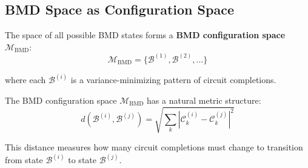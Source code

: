 \subsection{BMD Space as Configuration Space}

\begin{definition}
\label{def:bmd_space}
The space of all possible BMD states forms a \textbf{BMD configuration space} $\mathcal{M}_{\text{BMD}}$:
\begin{equation}
\mathcal{M}_{\text{BMD}} = \{\mathcal{B}^{(1)}, \mathcal{B}^{(2)}, \ldots\}
\end{equation}

where each $\mathcal{B}^{(i)}$ is a variance-minimizing pattern of circuit completions.
\end{definition}

\begin{theorem}
\label{thm:bmd_geometry}
The BMD configuration space $\mathcal{M}_{\text{BMD}}$ has a natural metric structure:
\begin{equation}
d(\mathcal{B}^{(i)}, \mathcal{B}^{(j)}) = \sqrt{\sum_{k} |\mathcal{C}_k^{(i)} - \mathcal{C}_k^{(j)}|^2}
\end{equation}

This distance measures how many circuit completions must change to transition from state $\mathcal{B}^{(i)}$ to state $\mathcal{B}^{(j)}$.
\end{theorem}


